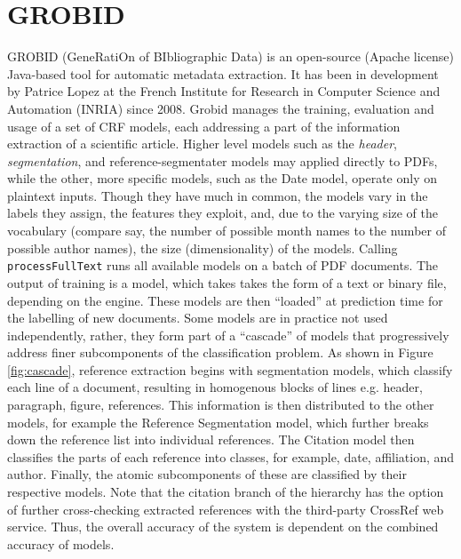 \section{GROBID}
\label{sec:grobid}
GROBID (GeneRatiOn of BIbliographic Data) \cite{lopez2009grobid} is an open-source (Apache license) Java-based tool for automatic metadata extraction. It has been in development by Patrice Lopez at the French Institute for Research in Computer Science and Automation (INRIA) since 2008. Grobid manages the training, evaluation and usage of a set of CRF models, each addressing a part of the information extraction of a scientific article. Higher level models such as the \emph{header}, \emph{segmentation}, and {reference-segmentater} models may applied directly to PDFs, while the other, more specific models, such as the Date model, operate only on plaintext inputs. Though they have much in common, the models vary in the labels they assign, the features they exploit, and, due to the varying size of the vocabulary (compare say, the number of possible month names to the number of possible author names), the size (dimensionality) of the models. Calling \texttt{processFullText} runs all available models on a batch of PDF documents. The output of training is a model, which takes takes the form of a text or binary file, depending on the engine. These models are then ``loaded'' at prediction time for the labelling of new documents. Some models are in practice not used independently, rather, they form part of a ``cascade'' of models that progressively address finer subcomponents of the classification problem. As shown in Figure \ref{fig:cascade}, reference extraction begins with segmentation models, which classify each line of a document, resulting in homogenous blocks of lines e.g. header, paragraph, figure, references. This information is then distributed to the other models, for example the Reference Segmentation model, which further breaks down the reference list into individual references. The Citation model then classifies the parts of each reference into classes, for example, date, affiliation, and author. Finally, the atomic subcomponents of these are classified by their respective models. Note that the citation branch of the hierarchy has the option of further cross-checking extracted references with the third-party CrossRef web service. Thus, the overall accuracy of the system is dependent on the combined accuracy of models.

